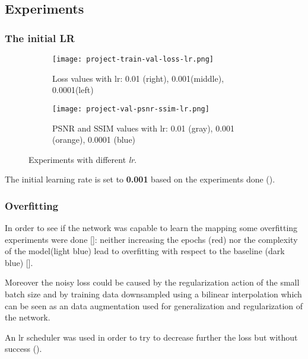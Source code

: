 \subsection{Experiments}

\subsubsection{The initial LR}

\begin{figure}[h]
    \begin{subfigure}{\textwidth}
        \centering
        \texttt{[image: project-train-val-loss-lr.png]}
        \caption{Loss values with lr: 0.01 (right), 0.001(middle), 0.0001(left)}
    \end{subfigure}
    \begin{subfigure}{\textwidth}
        \centering
        \texttt{[image: project-val-psnr-ssim-lr.png]}
        \caption{PSNR and SSIM values with lr: 0.01 (gray), 0.001 (orange), 0.0001 (blue)}        
    \end{subfigure}
    \caption{Experiments with different \textit{lr}.}\label{project:lr-experiments}
\end{figure}

The initial learning rate is set to \textbf{0.001} based on the experiments done ().

\subsubsection{Overfitting}

In order to see if the network was capable to learn the mapping some overfitting experiments were done []: neither increasing the epochs (red) nor the complexity of the model(light blue) lead to overfitting with respect to the baseline (dark blue) [].

Moreover the noisy loss could be caused by the regularization action of the small batch size and by training data downsampled using a bilinear interpolation which can be seen as an data augmentation used for generalization and regularization of the network.

An lr scheduler was used in order to try to decrease further the loss but without success ().


